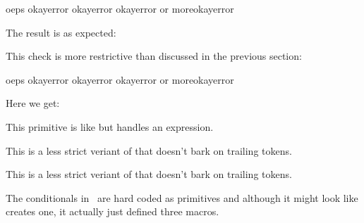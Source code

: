 \startbuffer
\ifchknum oeps        \or okay\else error\fi\quad
{}          \or okay\else error\fi\quad
\ifchknum 12pt        \or okay\else error\fi\quad
\ifchknum 12pt or more\or okay\else error\fi
\stopbuffer

\typebuffer

The result is as expected:

{\getbuffer}

\stopnewprimitive

\startnewprimitive[title={\prm {ifchknumber}}]

This check is more restrictive than  discussed in the previous
section:

\startbuffer
\ifchknumber oeps        \or okay\else error\fi\quad
{}          \or okay\else error\fi\quad
\ifchknumber 12pt        \or okay\else error\fi\quad
\ifchknumber 12pt or more\or okay\else error\fi
\stopbuffer

\typebuffer

Here we get:

{\getbuffer}

\stopnewprimitive

\startnewprimitive[title={\prm {ifchknumexpr}}]

This primitive is like  but handles an expression.

\stopnewprimitive

\startnewprimitive[title={\prm {ifcmpdim}}]

This is a less strict veriant of  that doesn't bark on
trailing tokens.

\stopnewprimitive

\startnewprimitive[title={\prm {ifcmpnum}}]

This is a less strict veriant of  that doesn't bark on
trailing tokens.

\stopnewprimitive

\startnewprimitive[title={\prm {ifcondition}}]

The conditionals in \TEX\ are hard coded as primitives and although it might
look like \type {\newif} creates one, it actually just defined three macros.

\startbuffer
\newif\ifMyTest
\meaning\MyTesttrue  \crlf
\meaning\MyTestfalse \crlf
\meaning\ifMyTest    \crlf \MyTesttrue
\meaning\ifMyTest    \par
\stopbuffer

\typebuffer {\tttf \getbuffer}

